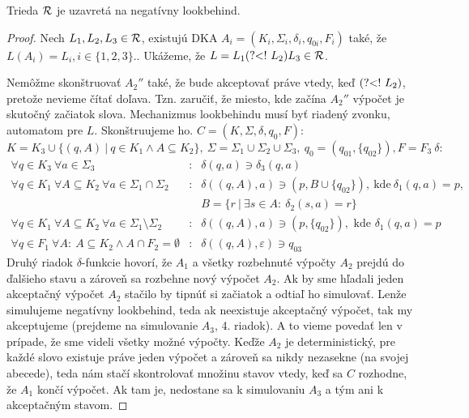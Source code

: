 \begin{lema}\label{nlb+R}
Trieda ${\cal R}$ je uzavretá na negatívny lookbehind.
\end{lema}
\begin{proof}
Nech $L_1,L_2,L_3 \in {\cal R}$, existujú DKA $ A_{i} = (K_{i},\Sigma_{i},\delta_{i},q_{0i},F_{i}) $ také, že $ L(A_{i})=L_{i}, i \in \lbrace 1,2,3\rbrace $.. Ukážeme, že $L=L_1\text{(?\textless !~} L_2)L_3 \in {\cal R}$.

Nemôžme skonštruovať $A_2''$ také, že bude akceptovať práve vte\-dy, keď $\text{(?\textless !~} L_2)$, pretože nevieme čítať doľava. Tzn. zaručiť, že miesto, kde začína $A_2''$ výpočet je skutočný začiatok slova. Mechanizmus lookbehindu musí byť riadený zvonku, automatom pre $L$. Skonštruujeme ho. $C=(K,\Sigma, \delta,q_0,F):$ 
$$K=K_3\cup \lbrace (q,A) ~|~ q \in K_1 \wedge A \subseteq K_2 \rbrace,~\Sigma = \Sigma_1\cup\Sigma_2\cup\Sigma_3,~q_0=(q_{01},\lbrace q_{02}\rbrace),F=F_3~ \delta:$$
\begin{eqnarray*}
\forall q \in K_3~ \forall a \in \Sigma_3 &:& \delta(q,a) \ni \delta_3(q,a) \\
\forall q \in K_1 ~\forall A \subseteq K_2~ \forall a \in \Sigma_1 \cap \Sigma_2 &:& \delta((q,A),a) \ni (p,B\cup \lbrace q_{02}\rbrace), ~\text{kde}~ \delta_1(q,a)=p,\\ &~& B=\lbrace r ~|~ \exists s \in A:~ \delta_2(s,a)=r \rbrace \\
\forall q \in K_1 ~\forall A \subseteq K_2 ~ \forall a \in \Sigma_1 \setminus \Sigma_2 &:& \delta((q,A),a) \ni (p,\lbrace q_{02}\rbrace), \text{ kde } \delta_1(q,a)=p \\
\forall q \in F_1~\forall A: ~A \subseteq K_2 \wedge A \cap F_2 = \emptyset &:& \delta((q,A),\varepsilon) \ni q_{03}
\end{eqnarray*}
Druhý riadok $\delta$-funkcie hovorí, že $A_1$ a všetky rozbehnuté výpočty $A_2$ prejdú do ďalšieho stavu a zároveň sa rozbehne nový výpočet $A_2$. Ak by sme hľadali jeden akceptačný výpočet $A_2$ stačilo by tipnúť si začiatok a odtiaľ ho simulovať. Lenže simulujeme negatívny lookbehind, teda ak neexistuje akceptačný výpočet, tak my akceptujeme (prejdeme na simulovanie $A_3$, 4. riadok). A to vieme povedať len v prípade, že sme videli všetky možné výpočty. Keďže $A_2$ je deterministický, pre každé slovo existuje práve jeden výpočet a zároveň sa nikdy nezasekne (na svojej abecede), teda nám stačí skontrolovať množinu stavov vtedy, keď sa $C$ rozhodne, že $A_1$ končí výpočet. Ak tam je, nedostane sa k simulovaniu $A_3$ a tým ani k akceptačným stavom.


\end{proof}
